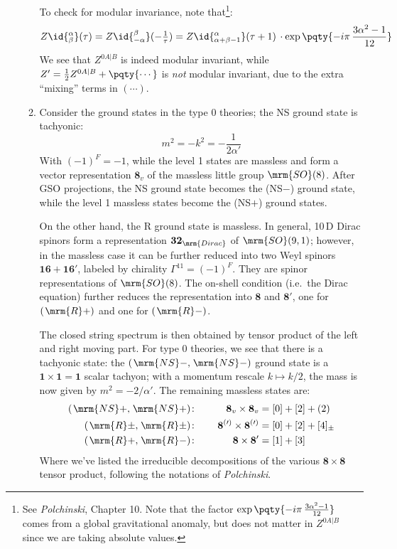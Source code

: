 \documentclass[a4paper,10pt]{article}
\newcommand{\NS}{\ensuremath{\mspace{2mu}\mrm{NS}}}
\newcommand{\R}{\ensuremath{\mspace{2mu}\mrm{R}}}
\newcommand{\mbf}[1]{\mathbf{#1}}
\begin{document}
\begin{enumerate}
\begin{enumerate}
	To check for modular invariance, note that\footnote{
		See \textit{Polchinski}, Chapter 10. Note that the factor $
			\exp \pqty{
				- i\pi\, \frac{3\alpha^2 - 1}{12}
			}
		$ comes from a global gravitational anomaly, but does not matter in $Z^{0A|B}$ since we are taking absolute values. 
	}:
	\begin{equation}
		Z\id{^\alpha_\beta}(\tau)
		= Z\id{^\beta_{-\alpha}}(-\tfrac{1}{\tau})
		= Z\id{^\alpha_{\alpha + \beta - 1}}(\tau + 1)\,
			\cdot \exp \pqty{
				- i\pi\, \frac{3\alpha^2 - 1}{12}
			}
	\end{equation}
	We see that $Z^{0A|B}$ is indeed modular invariant, while $
		Z' = \frac{1}{2} Z^{0A|B}
			+ \pqty{\cdots}
	$ is \textit{not} modular invariant, due to the extra ``mixing'' terms in $(\cdots)$. 
	
	\item Consider the ground states in the type 0 theories; the NS ground state is tachyonic: 
	\begin{equation}
		m^2 = -k^2 = -\frac{1}{2\alpha'}
	\end{equation}
	With $(-1)^F = -1$, while the level 1 states are massless and form a vector representation $\mbf{8}_v$ of the massless little group $\mrm{SO}(8)$. After GSO projections, the NS ground state becomes the (NS$-$) ground state, while the level 1 massless states become the (NS$+$) ground states. 
	
	On the other hand, the R ground state is massless. In general, 10\,D Dirac spinors form a representation $\mbf{32}_{\mrm{Dirac}}$ of $\mrm{SO}(9,1)$; however, in the massless case it can be further reduced into two Weyl spinors $\mbf{16} + \mbf{16}'$, labeled by chirality $\Gamma^{11} = (-1)^F$. They are spinor representations of $\mrm{SO}(8)$. The on-shell condition (i.e.\ the Dirac equation) further reduces the representation into $\mbf{8}$ and $\mbf{8}'$, one for $(\R+)$ and one for $(\R-)$. 
	
	The closed string spectrum is then obtained by tensor product of the left and right moving part. For type 0 theories, we see that there is a tachyonic state: the $(\NS-,\NS-)$ ground state is a $\mbf{1}\times \mbf{1} = \mbf{1}$ scalar tachyon; with a momentum rescale $k\mapsto k/2$, the mass is now given by $m^2 = -2/\alpha'$. The remaining massless states are:
	\begin{alignat}{2}
		(\NS+,\NS+)\colon&\quad&
			\mbf{8}_v \times \mbf{8}_v
			&= [0] + [2] + (2) \\
		(\R\pm,\R\pm)\colon&&
			\mbf{8}^{(\prime)} \times \mbf{8}^{(\prime)}
			&= [0] + [2] + [4]_\pm \\
		(\R+,\R-)\colon&&
			\mbf{8} \times \mbf{8}'
			&= [1] + [3]
	\end{alignat}
	Where we've listed the irreducible decompositions of the various $\mbf{8} \times \mbf{8}$ tensor product, following the notations of \textit{Polchinski}. 
	

\end{enumerate}
\end{enumerate}
\end{document}
